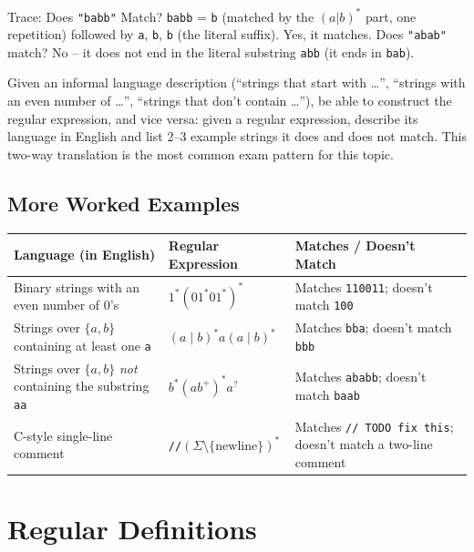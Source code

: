 \documentclass[full-course-notes.tex]{subfiles}
\begin{document}
\begin{examplebox}{Trace: Does \texttt{"babb"} Match?}
\texttt{babb} = \texttt{b} (matched by the $(a|b)^*$ part, one repetition) followed by
\texttt{a}, \texttt{b}, \texttt{b} (the literal suffix). Yes, it matches. Does \texttt{"abab"}
match? No -- it does not end in the literal substring \texttt{abb} (it ends in \texttt{bab}).
\end{examplebox}

\begin{examfocus}
Given an informal language description (``strings that start with \dots'', ``strings with an
even number of \dots'', ``strings that don't contain \dots''), be able to construct the regular
expression, and vice versa: given a regular expression, describe its language in English and
list 2--3 example strings it does and does not match. This two-way translation is the most
common exam pattern for this topic.
\end{examfocus}

\subsection{More Worked Examples}
\label{sec:l4-more-worked-examples}

\begin{center}
\renewcommand{\arraystretch}{1.4}
\begin{tabularx}{\textwidth}{@{}X l X@{}}
\toprule
\textbf{Language (in English)} & \textbf{Regular Expression} & \textbf{Matches / Doesn't Match} \\
\midrule
Binary strings with an even number of 0's & $1^{*}(01^{*}01^{*})^{*}$ & Matches \texttt{110011};
doesn't match \texttt{100} \\
Strings over $\{a,b\}$ containing at least one \texttt{a} & $(a\mid b)^{*}a(a\mid b)^{*}$ &
Matches \texttt{bba}; doesn't match \texttt{bbb} \\
Strings over $\{a,b\}$ \emph{not} containing the substring \texttt{aa} & $b^{*}(ab^{+})^{*}a^{?}$
& Matches \texttt{ababb}; doesn't match \texttt{baab} \\
C-style single-line comment & \texttt{//}$(\Sigma \setminus \{\text{newline}\})^{*}$ & Matches
\texttt{// TODO fix this}; doesn't match a two-line comment \\
\bottomrule
\end{tabularx}
\end{center}

\section{Regular Definitions}
\label{sec:l4-regular-definitions}
\end{document}
